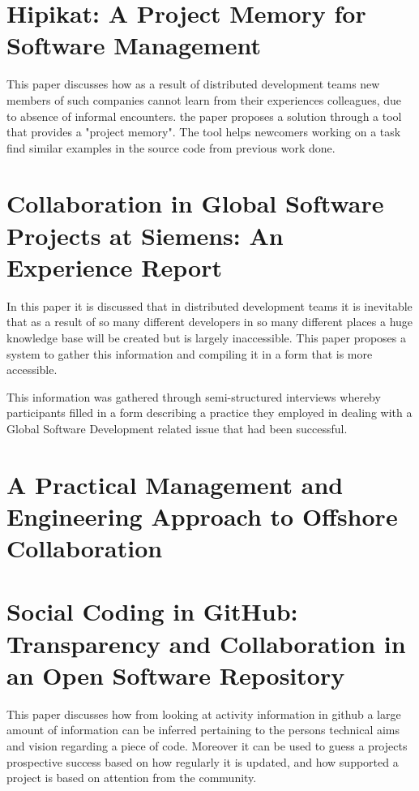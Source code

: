 \documentclass{l4proj}
\begin{document}
\section {Hipikat: A Project Memory for Software Management}

This paper discusses how as a result of distributed development teams new members of such companies cannot learn from their experiences colleagues, due to absence of informal encounters.
 the paper proposes a solution through a tool that provides a "project memory".  The tool helps newcomers working on a task find similar examples in the source code from previous work done.  

\section {Collaboration in Global Software Projects at Siemens: An Experience Report}

In this paper it is discussed that in distributed development teams it is inevitable that as a result of so many different developers in so many different places a huge knowledge base will be created but is largely inaccessible.  This paper proposes a system to gather this information and compiling it in a form that is more accessible.

This information was gathered through semi-structured interviews whereby participants filled in a form describing a practice they employed in dealing with a Global Software Development related issue that had been successful.

\section {A Practical Management and Engineering Approach to Offshore Collaboration}

\section {Social Coding in GitHub: Transparency and Collaboration in an Open Software Repository}

This paper discusses how from looking at activity information in github a large amount of information can be inferred pertaining to the persons technical aims and vision regarding a piece of code.  Moreover it can be used to guess a projects prospective success based on how regularly it is updated, and how supported a project is based on attention from the community.
\end{document}
